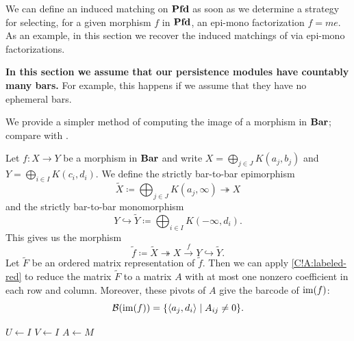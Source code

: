 We can define an induced matching on $\Pfd$ as soon as we determine a strategy for selecting, for a given morphism $f$ in $\Pfd$, an epi-mono factorization $f = me$. As an example, in this section we recover the induced matchings of \cite{gonzalez2020additive,GST2025} via epi-mono factorizations.

\textbf{In this section we assume that our persistence modules have countably many bars.} For example, this happens if we assume that they have no ephemeral bars.

We provide a simpler method of computing the image of a morphism in $\Bar$; compare with \cite{TorrasCasas2023}.

\begin{proposition}
\label{C!P:image-barcode}
  Let $f \colon X \to Y$ be a morphism in $\Bar$ and write $X = \bigoplus_{j \in J} K(a_j, b_j)$ and $Y = \bigoplus_{i \in I} K(c_i, d_i)$. We define the strictly bar-to-bar epimorphism
  \[
    \tilde{X} \coloneq \bigoplus_{j \in J} K(a_j, \infty) \twoheadrightarrow X
  \]
  and the strictly bar-to-bar monomorphism
  \[
    Y \hookrightarrow \tilde{Y} \coloneq \bigoplus_{i \in I} K(-\infty, d_i).
  \]
  This gives us the morphism
  \[
    \tilde{f} \coloneq \tilde{X} \twoheadrightarrow X \xrightarrow{f} Y \hookrightarrow \tilde{Y}.
  \]
  Let $\tilde{F}$ be an ordered matrix representation of $\tilde{f}$.
  Then we can apply \cref{C!A:labeled-red} to reduce the matrix $\tilde{F}$ to a matrix $A$ with at most one nonzero coefficient in each row and column. Moreover, these pivots of $A$ give the barcode of $\im(f)$:
  \[
    \cc{B}(\im(f)) = \{ \langle a_j, d_i \rangle \mid A_{ij} \neq 0 \}.
  \]
\end{proposition}

\begin{algorithm}[tbp]
  \caption{Infinite column-finite labeled matrix reduction. Notations are as in \cref{C!A:inf-red}.}
  \label{C!A:labeled-red}

  $U \leftarrow I$\;
  $V \leftarrow I$\;
  $A \leftarrow M$\;
\end{algorithm}

